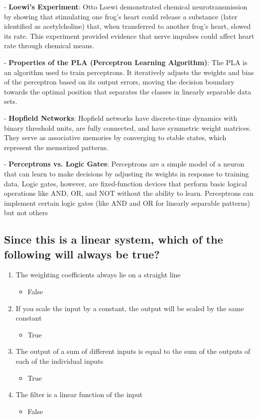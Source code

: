 \documentclass{article}
\begin{document}
- \textbf{Loewi's Experiment}: Otto Loewi demonstrated chemical neurotransmission by showing that stimulating one frog's heart could release a substance (later identified as acetylcholine) that, when transferred to another frog's heart, slowed its rate. This experiment provided evidence that nerve impulses could affect heart rate through chemical means.

- \textbf{Properties of the PLA (Perceptron Learning Algorithm)}: The PLA is an algorithm used to train perceptrons. It iteratively adjusts the weights and bias of the perceptron based on its output errors, moving the decision boundary towards the optimal position that separates the classes in linearly separable data sets.

- \textbf{Hopfield Networks}: Hopfield networks have discrete-time dynamics with binary threshold units, are fully connected, and have symmetric weight matrices. They serve as associative memories by converging to stable states, which represent the memorized patterns.

- \textbf{Perceptrons vs. Logic Gates}: Perceptrons are a simple model of a neuron that can learn to make decisions by adjusting its weights in response to training data. Logic gates, however, are fixed-function devices that perform basic logical operations like AND, OR, and NOT without the ability to learn. Perceptrons can implement certain logic gates (like AND and OR for linearly separable patterns) but not others

\subsection*{Since this is a linear system, which of the following will always be true?}

\begin{enumerate}
    \item The weighting coefficients always lie on a straight line
      \begin{itemize}
        \item False
      \end{itemize}
    \item If you scale the input by a constant, the output will be scaled by the same constant
      \begin{itemize}
        \item True
      \end{itemize}
    \item The output of a sum of different inputs is equal to the sum of the outputs of each of the individual inputs
      \begin{itemize}
        \item True
      \end{itemize}
    \item The filter is a linear function of the input
      \begin{itemize}
        \item False
      \end{itemize}
\end{enumerate}
\end{document}
